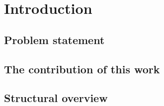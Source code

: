 \section{Introduction}
\label{sec:introduction}

\subsection{Problem statement}
\label{sec:prob_stmt}

\subsection{The contribution of this work}
\label{sec:contribution}

\subsection{Structural overview}
\label{sec:structural_overview}

